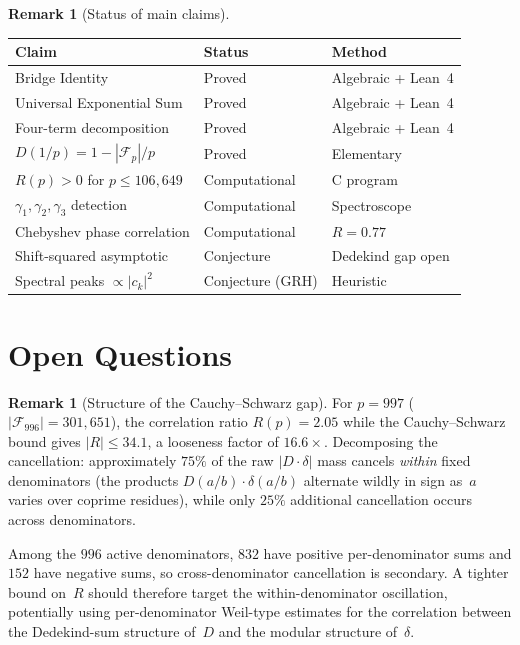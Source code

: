 \documentclass[11pt]{article}
\theoremstyle{definition}
\newtheorem{remark}[theorem]{Remark}
\newcommand{\F}{\mathcal{F}}
\begin{document}
\begin{remark}[Status of main claims]
\begin{center}
\begin{tabular}{lll}
\toprule
Claim & Status & Method \\
\midrule
Bridge Identity & Proved & Algebraic + Lean~4 \\
Universal Exponential Sum & Proved & Algebraic + Lean~4 \\
Four-term decomposition & Proved & Algebraic + Lean~4 \\
$D(1/p) = 1 - |\F_p|/p$ & Proved & Elementary \\
$R(p) > 0$ for $p \le 106{,}649$ & Computational & C program \\
$\gamma_1,\gamma_2,\gamma_3$ detection & Computational & Spectroscope \\
Chebyshev phase correlation & Computational & $R = 0.77$ \\
Shift-squared asymptotic & Conjecture & Dedekind gap open \\
Spectral peaks $\propto |c_k|^2$ & Conjecture (GRH) & Heuristic \\
\bottomrule
\end{tabular}
\end{center}
\end{remark}

\section{Open Questions}\label{sec:open}

\begin{remark}[Structure of the Cauchy--Schwarz gap]\label{rem:cs-gap}
For $p = 997$ ($|\F_{996}| = 301{,}651$), the correlation ratio
$R(p) = 2.05$ while the Cauchy--Schwarz bound gives
$|R| \le 34.1$, a looseness factor of $16.6\times$.
Decomposing the cancellation:
approximately $75\%$ of the raw $|D\cdot\delta|$ mass
cancels \emph{within} fixed denominators (the products
$D(a/b)\cdot\delta(a/b)$ alternate wildly in sign as~$a$
varies over coprime residues), while only $25\%$ additional
cancellation occurs across denominators.

Among the $996$ active denominators, $832$ have positive
per-denominator sums and $152$ have negative sums,
so cross-denominator cancellation is secondary.
A tighter bound on~$R$ should therefore target the
within-denominator oscillation, potentially using
per-denominator Weil-type estimates for the correlation
between the Dedekind-sum structure of~$D$ and the
modular structure of~$\delta$.
\end{remark}
\end{document}
